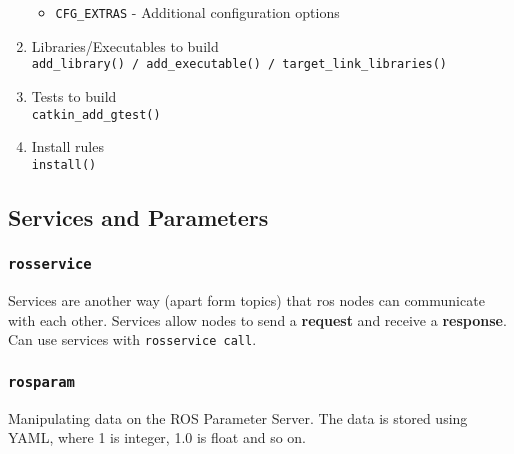 \documentclass[12pt, a4paper, english]{article}
\begin{document}
\begin{enumerate}
\begin{itemize}
    \item \texttt{CFG\_EXTRAS} - Additional configuration options
  \end{itemize}
  \item Libraries/Executables to build \\
  \texttt{add\_library() / add\_executable() / target\_link\_libraries()}
  \item Tests to build \\
  \texttt{catkin\_add\_gtest()}
  \item Install rules \\
  \texttt{install()}
\end{enumerate}

\subsection{Services and Parameters}
\subsubsection{\texttt{rosservice}}
Services are another way (apart form topics) that ros nodes can communicate with each other. Services allow nodes to send a \textbf{request} and receive a \textbf{response}.
Can use services with \texttt{rosservice call}.
\subsubsection{\texttt{rosparam}}
Manipulating data on the ROS Parameter Server. The data is stored using YAML, where 1 is integer, 1.0 is float and so on.
\end{document}

